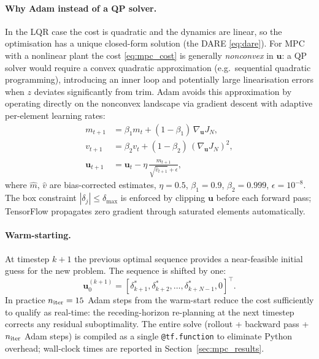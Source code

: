 \paragraph{Why Adam instead of a QP solver.}
In the LQR case the cost is quadratic and the dynamics are linear, so the
optimisation has a unique closed-form solution (the DARE \eqref{eq:dare}).
For MPC with a nonlinear plant the cost \eqref{eq:mpc_cost} is generally
\emph{nonconvex} in $\mathbf{u}$: a QP solver would require a convex quadratic
approximation (e.g.\ sequential quadratic programming), introducing an inner
loop and potentially large linearisation errors when $z$ deviates significantly
from trim.
Adam \citep{kingma2015adam} avoids this approximation by operating directly on
the nonconvex landscape via gradient descent with adaptive per-element learning
rates:
\begin{align}
  m_{t+1} &= \beta_1 m_t + (1-\beta_1)\,\nabla_{\mathbf{u}} J_N, \label{eq:adam_m}\\
  v_{t+1} &= \beta_2 v_t + (1-\beta_2)\,(\nabla_{\mathbf{u}} J_N)^2, \label{eq:adam_v}\\
  \mathbf{u}_{t+1} &= \mathbf{u}_t - \eta\,\frac{\hat{m}_{t+1}}{\sqrt{\hat{v}_{t+1}} + \epsilon},
  \label{eq:adam_update}
\end{align}
where $\hat{m}$, $\hat{v}$ are bias-corrected estimates, $\eta = 0.5$,
$\beta_1 = 0.9$, $\beta_2 = 0.999$, $\epsilon = 10^{-8}$.
The box constraint $|\delta_j| \le \delta_{\max}$ is enforced by clipping
$\mathbf{u}$ before each forward pass; TensorFlow propagates zero gradient
through saturated elements automatically.

\paragraph{Warm-starting.}
\label{sec:warm_start}
At timestep $k+1$ the previous optimal sequence provides a near-feasible
initial guess for the new problem.
The sequence is shifted by one:
\begin{equation}
  \mathbf{u}_0^{(k+1)} = [\delta_{k+1}^*, \delta_{k+2}^*, \ldots, \delta_{k+N-1}^*, 0]^\top.
  \label{eq:warm_start}
\end{equation}
In practice $n_{\rm iter} = 15$ Adam steps from the warm-start reduce the cost
sufficiently to qualify as real-time: the receding-horizon re-planning at the
next timestep corrects any residual suboptimality.
The entire solve (rollout + backward pass + $n_{\rm iter}$ Adam steps) is
compiled as a single \texttt{@tf.function} to eliminate Python overhead;
wall-clock times are reported in Section~\ref{sec:mpc_results}.

